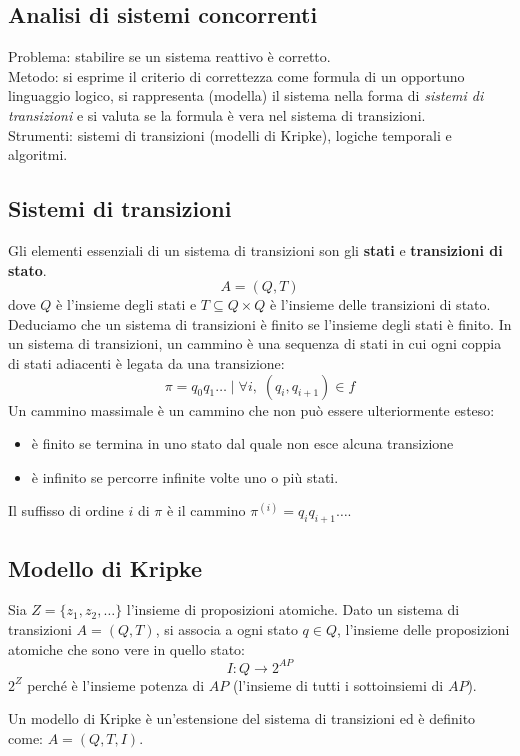 \subsection{Analisi di sistemi concorrenti}
Problema: stabilire se un sistema reattivo è corretto.\\
Metodo: si esprime il criterio di correttezza come formula di un opportuno linguaggio logico, si rappresenta (modella) il sistema nella forma di \textit{sistemi di transizioni} e si valuta se la formula è vera nel sistema di transizioni.\\
Strumenti: sistemi di transizioni (modelli di Kripke), logiche temporali e algoritmi.

\subsection{Sistemi di transizioni}
Gli elementi essenziali di un sistema di transizioni son gli \textbf{stati} e \textbf{transizioni di stato}.
\[A = (Q, T)\]
dove $Q$ è l’insieme degli stati e $T \subseteq Q \times Q$ è l’insieme delle transizioni di stato. Deduciamo che un sistema di transizioni è finito se l’insieme degli stati è finito.
In un sistema di transizioni, un cammino è una sequenza di stati in cui ogni coppia di stati adiacenti è legata da una transizione: \[\pi = q_0 q_1 \dots \; | \; \forall i, \; (q_i, q_{i+1}) \in f\]
Un cammino massimale è un cammino che non può essere ulteriormente esteso: 
\begin{itemize}
    \item è finito se termina in uno stato dal quale non esce alcuna transizione
    \item è infinito se percorre infinite volte uno o più stati.
\end{itemize}
Il suffisso di ordine $i$ di $\pi$ è il cammino $\pi^{(i)} = q_i q_{i+1} \dots$.

\subsection{Modello di Kripke}


Sia $Z = \{z_1, z_2, \dots \}$ l’insieme di proposizioni atomiche.
Dato un sistema di transizioni $A = (Q, T)$, si associa a ogni stato $q \in Q$, l’insieme delle proposizioni atomiche che sono vere in quello stato: \[I : Q \to 2^{AP}\]
$2^Z$ perché è l’insieme potenza di $AP$ (l’insieme di tutti i sottoinsiemi di $AP$). 

Un modello di Kripke è un’estensione del sistema di transizioni ed è definito come: $A = (Q, T, I)$.

